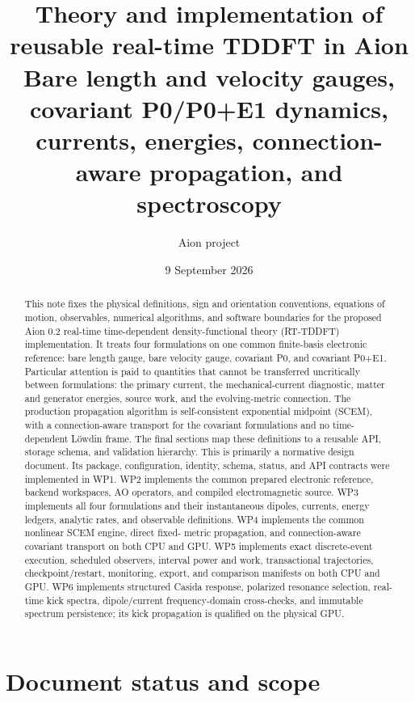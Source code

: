 \documentclass[11pt]{article}
\title{Theory and implementation of reusable real-time TDDFT in Aion\\
\large Bare length and velocity gauges, covariant P0/P0+E1 dynamics,\\
currents, energies, connection-aware propagation, and spectroscopy}
\author{Aion project}
\date{9 September 2026}
\begin{document}
\maketitle

\begin{abstract}
This note fixes the physical definitions, sign and orientation conventions,
equations of motion, observables, numerical algorithms, and software boundaries
for the proposed Aion 0.2 real-time time-dependent density-functional theory
(RT-TDDFT) implementation. It treats four formulations on one common
finite-basis electronic reference: bare length gauge, bare velocity gauge,
covariant P0, and covariant P0+E1. Particular attention is paid to quantities
that cannot be transferred uncritically between formulations: the primary
current, the mechanical-current diagnostic, matter and generator energies,
source work, and the evolving-metric connection. The production propagation
algorithm is self-consistent exponential midpoint (SCEM), with a
connection-aware transport for the covariant formulations and no
time-dependent L\"owdin frame. The final sections map these definitions to a
reusable API, storage schema, and validation hierarchy. This is primarily a
normative design document. Its package, configuration, identity, schema,
status, and API contracts were implemented in WP1. WP2 implements the common
prepared electronic reference, backend workspaces, AO operators, and compiled
electromagnetic source. WP3 implements all four formulations and their
instantaneous dipoles, currents, energy ledgers, analytic rates, and observable
definitions. WP4 implements the common nonlinear SCEM engine, direct fixed-
metric propagation, and connection-aware covariant transport on both CPU and
GPU. WP5 implements exact discrete-event execution, scheduled observers,
interval power and work, transactional trajectories, checkpoint/restart,
monitoring, export, and comparison manifests on both CPU and GPU.
WP6 implements structured Casida response, polarized resonance selection,
real-time kick spectra, dipole/current frequency-domain cross-checks, and
immutable spectrum persistence; its kick propagation is qualified on the
physical GPU.
\end{abstract}

\tableofcontents

\section{Document status and scope}
\end{document}
